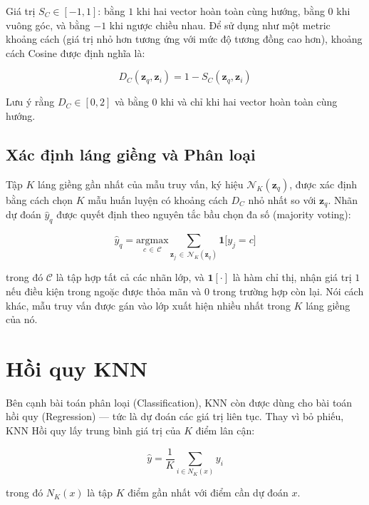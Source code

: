 \documentclass[12pt,a4paper]{article}
\begin{document}
Giá trị $S_C \in [-1, 1]$: bằng $1$ khi hai vector hoàn toàn cùng hướng,
bằng $0$ khi vuông góc, và bằng $-1$ khi ngược chiều nhau. Để sử dụng
như một metric khoảng cách (giá trị nhỏ hơn tương ứng với mức độ tương
đồng cao hơn), khoảng cách Cosine được định nghĩa là:

\begin{equation}
    D_C(\mathbf{z}_q, \mathbf{z}_i) = 1 - S_C(\mathbf{z}_q, \mathbf{z}_i)
\end{equation}

Lưu ý rằng $D_C \in [0, 2]$ và bằng $0$ khi và chỉ khi hai vector hoàn
toàn cùng hướng.

\subsection{Xác định láng giềng và Phân loại}

Tập $K$ láng giềng gần nhất của mẫu truy vấn, ký hiệu
$\mathcal{N}_K(\mathbf{z}_q)$, được xác định bằng cách chọn $K$ mẫu
huấn luyện có khoảng cách $D_C$ nhỏ nhất so với $\mathbf{z}_q$.
Nhãn dự đoán $\hat{y}_q$ được quyết định theo nguyên tắc bầu chọn đa số
(majority voting):

\begin{equation}
    \hat{y}_q
    = \underset{c \,\in\, \mathcal{C}}{\mathrm{argmax}}
      \sum_{\mathbf{z}_j \,\in\, \mathcal{N}_K(\mathbf{z}_q)}
      \mathbf{1}\bigl[y_j = c\bigr]
\end{equation}

trong đó $\mathcal{C}$ là tập hợp tất cả các nhãn lớp, và
$\mathbf{1}[\cdot]$ là hàm chỉ thị, nhận giá trị $1$ nếu điều kiện trong
ngoặc được thỏa mãn và $0$ trong trường hợp còn lại. Nói cách khác, mẫu
truy vấn được gán vào lớp xuất hiện nhiều nhất trong $K$ láng giềng của nó.
\section{Hồi quy KNN}

Bên cạnh bài toán phân loại (Classification), KNN còn được dùng cho bài toán hồi quy (Regression) — tức là dự đoán các giá trị liên tục. Thay vì bỏ phiếu, KNN Hồi quy lấy trung bình giá trị của $K$ điểm lân cận:

\begin{equation}
    \hat{y} = \frac{1}{K} \sum_{i \in N_K(x)} y_i
\end{equation}

trong đó $N_K(x)$ là tập $K$ điểm gần nhất với điểm cần dự đoán $x$.
\end{document}
